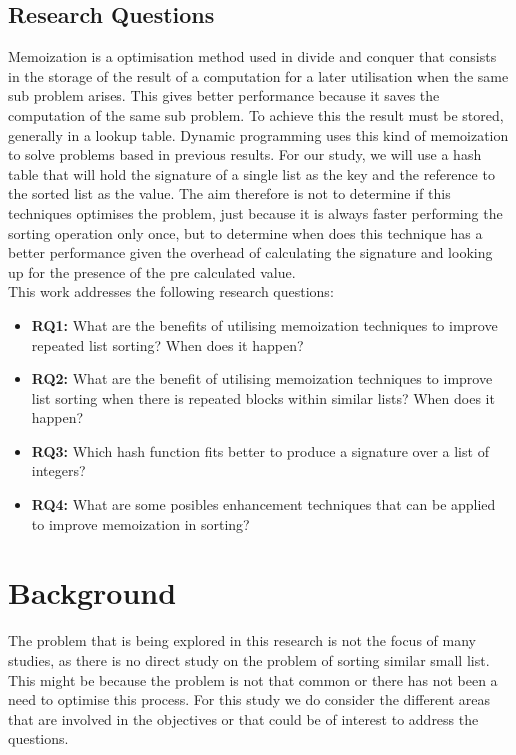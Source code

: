 \documentclass[a4paper,12pt]{article}
\begin{document}
\subsection*{Research Questions}
Memoization is a optimisation method used in divide and conquer that consists in the storage of the result of a computation for a later utilisation when the same sub problem arises. This gives better performance because it saves the computation of the same sub problem. To achieve this the result must be stored, generally in a lookup table. Dynamic programming uses this kind of memoization to solve problems based in previous results. For our study, we will use a hash table that will hold the signature of a single list as the key and the reference to the sorted list as the value. The aim therefore is not to determine if this techniques optimises the problem, just because it is always faster performing the sorting operation only once, but to determine when does this technique has a better performance given the overhead of calculating the signature and looking up for the presence of the pre calculated value.\\

This work addresses the following research questions:

\begin{itemize}
\item {\bf RQ1:} What are the benefits of utilising memoization techniques to improve repeated list sorting? When does it happen?
\item {\bf RQ2:} What are the benefit of utilising memoization techniques to improve list sorting when there is repeated blocks within similar lists? When does it happen?
\item {\bf RQ3:} Which hash function fits better to produce a signature over a list of integers?
\item {\bf RQ4:} What are some posibles enhancement techniques that can be applied to improve memoization in sorting?
\end{itemize}

\section{Background}

The problem that is being explored in this research is not the focus of many studies, as there is no direct study on the problem of sorting similar small list. This might be because the problem is not that common or there has not been a need to optimise this process. For this study we do consider the different areas that are involved in the objectives or that could be of interest to address the questions.
\end{document}
